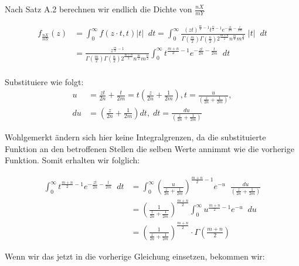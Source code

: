 \documentclass[12pt]{article}
\begin{document}
Nach Satz A.2 berechnen wir endlich die Dichte von $\frac{nX}{mY}$

\begin{align*}
	f_{ \frac{nX}{mY} }(z) &= \int_{0}^{\infty} f(z \cdot t, t) | t | \;\; dt
	= \int_{0}^{\infty} 
			 \frac{ 
				\left( zt \right)  ^{\frac{ m }{ 2 } - 1} t ^{\frac{ n }{ 2 }-1} e ^ {-\frac{ zt }{ 2n } -\frac{ t }{ 2m }}
				}{  
				\Gamma(\frac{ m }{ 2 }) \Gamma(\frac{ n }{ 2 })
				2 ^{\frac{ m+n }{ 2 }} 
				n ^{\frac{ m }{ 2 }} m ^{\frac{ n }{ 2 }}
			} \; |t| \;\; dt \\
	&= \frac{ z ^{\frac{ m }{ 2 }-1} }{ 
		\Gamma(\frac{ m }{ 2 }) \Gamma(\frac{ n }{ 2 })
		2 ^{\frac{ m+n }{ 2 }} 
		n ^{\frac{ m }{ 2 }} m ^{\frac{ n }{ 2 }}
	}
	\int_{0}^{\infty} t ^{ \frac{m+n}{2} - 1} e ^{ - \frac{ zt }{ 2n } - \frac{ t }{ 2m } } \;\; dt \\
\end{align*}

Substituiere wie folgt:
\begin{align*}
	u &= \frac{ zt }{ 2n } + \frac{ t }{ 2m } = t\left( \frac{ z }{ 2n } + \frac{ 1 }{ 2m } \right) ,
	t = \frac{ u }{ \left( \frac{ z }{ 2n } + \frac{ 1 }{ 2m } \right)},\\
	du &=   \left(
		\frac{ z }{ 2n } + \frac{ 1 }{ 2m }
	\right)  dt, \;
	dt = \frac{ du }{ \left( \frac{ z }{ 2n } + \frac{ 1 }{ 2m } \right) }
\end{align*}

Wohlgemerkt ändern sich hier keine Integralgrenzen, da die substituierte Funktion an den
betroffenen Stellen die selben Werte annimmt wie die vorherige Funktion.
Somit erhalten wir folglich:

\begin{align*}
	\int_{0}^{\infty} t ^{ \frac{m+n}{2} - 1} e ^{ - \frac{ zt }{ 2n } - \frac{ t }{ 2m } } \;\; dt
	&= \int_{0}^{\infty} \left( 
		\frac{ u }{ 
			\frac{ z }{ 2n } + \frac{ 1 }{ 2m }
		}
		\right) ^{\frac{m+n}{2} -1} e ^{-u} \;\; \frac{ du }{ 
		\left(  
		\frac{ z }{ 2n } + \frac{ 1 }{ 2m }
		\right) 
	}\\
	&= \left( 
		\frac{ 1 }{ 
			\frac{ z }{ 2n } + \frac{ 1 }{ 2m }
		}
		\right) ^{
		\frac{ m+n }{2}
	}
	\int_{0}^{\infty}  u ^{ \frac{ m+n }{ 2 } -1} e^{ -u }\;\; du\\
	&= \left( 
		\frac{ 1 }{ 
			\frac{ z }{ 2n } + \frac{ 1 }{ 2m }
		}
		\right) ^{
		\frac{ m+n }{2}
	} \cdot \Gamma \left( 
	\frac{ m+n }{ 2 }
\right) 
\end{align*}

Wenn wir das jetzt in die vorherige Gleichung einsetzen, bekommen wir:
\end{document}
